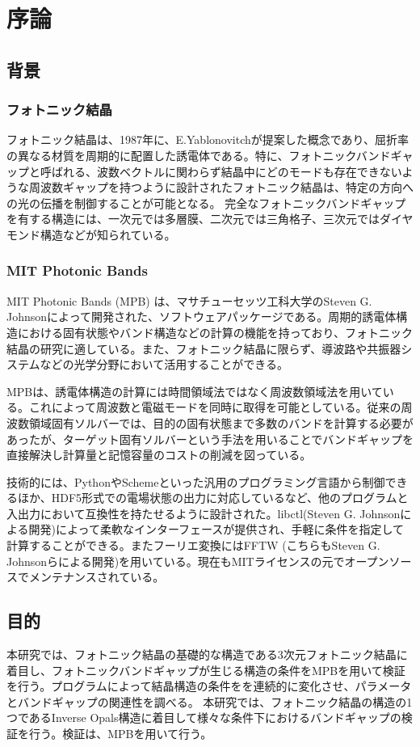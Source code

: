 \documentclass[platex,dvipdfmx]{jsreport}
\begin{document}
\chapter{序論}


\section{背景}

\subsection{フォトニック結晶}


フォトニック結晶は、1987年に、E.Yablonovitchが提案した概念であり、屈折率の異なる材質を周期的に配置した誘電体である。特に、フォトニックバンドギャップと呼ばれる、波数ベクトルに関わらず結晶中にどのモードも存在できないような周波数ギャップを持つように設計されたフォトニック結晶は、特定の方向への光の伝播を制御することが可能となる。
完全なフォトニックバンドギャップを有する構造には、一次元では多層膜、二次元では三角格子、三次元ではダイヤモンド構造などが知られている。


\subsection{MIT Photonic Bands}

MIT Photonic Bands (MPB) は、マサチューセッツ工科大学のSteven G. Johnsonによって開発された、ソフトウェアパッケージである。周期的誘電体構造における固有状態やバンド構造などの計算の機能を持っており、フォトニック結晶の研究に適している。また、フォトニック結晶に限らず、導波路や共振器システムなどの光学分野において活用することができる。

MPBは、誘電体構造の計算には時間領域法ではなく周波数領域法を用いている。これによって周波数と電磁モードを同時に取得を可能としている。従来の周波数領域固有ソルバーでは、目的の固有状態まで多数のバンドを計算する必要があったが、ターゲット固有ソルバーという手法を用いることでバンドギャップを直接解決し計算量と記憶容量のコストの削減を図っている。


技術的には、PythonやSchemeといった汎用のプログラミング言語から制御できるほか、HDF5形式での電場状態の出力に対応しているなど、他のプログラムと入出力において互換性を持たせるように設計された。libctl(Steven G. Johnsonによる開発)によって柔軟なインターフェースが提供され、手軽に条件を指定して計算することができる。またフーリエ変換にはFFTW (こちらもSteven G. Johnsonらによる開発)を用いている。現在もMITライセンスの元でオープンソースでメンテナンスされている。


\section{目的}
本研究では、フォトニック結晶の基礎的な構造である3次元フォトニック結晶に着目し、フォトニックバンドギャップが生じる構造の条件をMPBを用いて検証を行う。プログラムによって結晶構造の条件をを連続的に変化させ、パラメータとバンドギャップの関連性を調べる。
本研究では、フォトニック結晶の構造の1つであるInverse Opals構造に着目して様々な条件下におけるバンドギャップの検証を行う。検証は、MPBを用いて行う。
\end{document}
